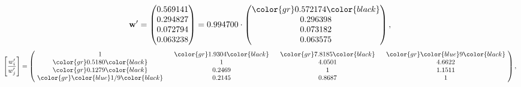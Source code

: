 \begin{example}
\begin{equation*}
\mathbf{w}^{\prime} =
\begin{pmatrix}
0.569141\\
0.294827\\
0.072794\\
0.063238
\end{pmatrix} =
0.994700\cdot
\begin{pmatrix}
\color{gr} 0.572174\color{black} \\
0.296398\\
0.073182\\
0.063575
\end{pmatrix},
\end{equation*}
\begin{equation*}
\left[ \frac{{w}^{\prime}_i}{{w}^{\prime}_j} \right] =
\begin{pmatrix}
$\,\,$ 1 $\,\,$ & $\,\,$\color{gr} 1.9304\color{black} $\,\,$ & $\,\,$\color{gr} 7.8185\color{black} $\,\,$ & $\,\,$\color{gr} \color{blue} 9\color{black} $\,\,$ \\
$\,\,$\color{gr} 0.5180\color{black} $\,\,$ & $\,\,$ 1 $\,\,$ & $\,\,$4.0501$\,\,$ & $\,\,$4.6622  $\,\,$ \\
$\,\,$\color{gr} 0.1279\color{black} $\,\,$ & $\,\,$0.2469$\,\,$ & $\,\,$ 1 $\,\,$ & $\,\,$1.1511 $\,\,$ \\
$\,\,$\color{gr} \color{blue}  1/9\color{black} $\,\,$ & $\,\,$0.2145$\,\,$ & $\,\,$0.8687$\,\,$ & $\,\,$ 1  $\,\,$ \\
\end{pmatrix},
\end{equation*}
\end{example}
\newpage
